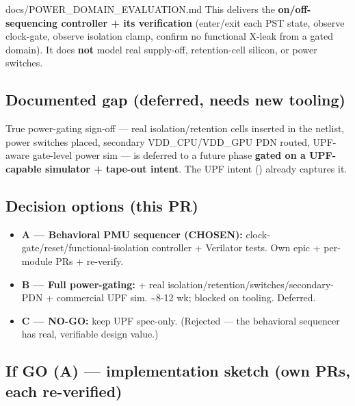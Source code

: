 \begin{relocated}{docs/POWER_DOMAIN_EVALUATION.md}
This delivers the \textbf{on/\allowbreak{}off-sequencing controller +
its verification} (enter/\allowbreak{}exit each PST state, observe
clock-gate, observe isolation clamp, confirm no functional X-leak from a
gated domain). It does \textbf{not} model real supply-off,
retention-cell silicon, or power switches.

\subsection{Documented gap (deferred, needs new tooling)}\label{tm:pd:power-domain-evaluation:4-documented-gap-deferred-needs-new-tooling}

True power-gating sign-off --- real isolation/\allowbreak{}retention
cells inserted in the netlist, power switches placed, secondary
VDD\_\allowbreak{}CPU/\allowbreak{}VDD\_\allowbreak{}GPU PDN routed,
UPF-aware gate-level power sim --- is deferred to a future phase
\textbf{gated on a UPF-capable simulator + tape-out intent}. The UPF
intent () already captures it.

\subsection{Decision options (this PR)}\label{tm:pd:power-domain-evaluation:5-decision-options-this-pr}

\begin{itemize}
\tightlist
\item
  \textbf{A --- Behavioral PMU sequencer (CHOSEN):}
  clock-gate/\allowbreak{}reset/\allowbreak{}functional-isolation
  controller + Verilator tests. Own epic + per-module PRs + re-verify.
\item
  \textbf{B --- Full power-gating:} + real
  isolation/\allowbreak{}retention/\allowbreak{}switches/\allowbreak{}secondary-PDN
  + commercial UPF sim. \textasciitilde8-12 wk; blocked on tooling.
  Deferred.
\item
  \textbf{C --- NO-GO:} keep UPF spec-only. (Rejected --- the behavioral
  sequencer has real, verifiable design value.)
\end{itemize}

\subsection{If GO (A) --- implementation sketch (own PRs, each
re-verified)}\label{tm:pd:power-domain-evaluation:6-if-go-a-implementation-sketch-own-prs-each-re-verified}


\end{relocated}
